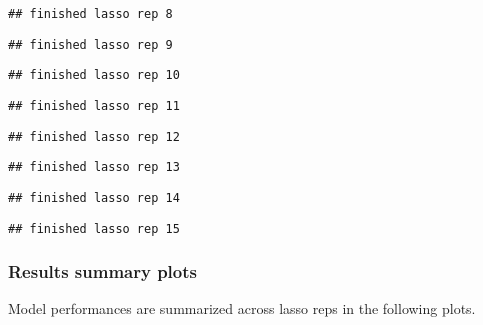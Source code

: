 \documentclass[]{article}
\begin{document}
\begin{verbatim}
## finished lasso rep 8
\end{verbatim}

\begin{verbatim}
## finished lasso rep 9
\end{verbatim}

\begin{verbatim}
## finished lasso rep 10
\end{verbatim}

\begin{verbatim}
## finished lasso rep 11
\end{verbatim}

\begin{verbatim}
## finished lasso rep 12
\end{verbatim}

\begin{verbatim}
## finished lasso rep 13
\end{verbatim}

\begin{verbatim}
## finished lasso rep 14
\end{verbatim}

\begin{verbatim}
## finished lasso rep 15
\end{verbatim}

\hypertarget{results-summary-plots}{%
\subsubsection{Results summary plots}\label{results-summary-plots}}

Model performances are summarized across lasso reps in the following
plots.
\end{document}
